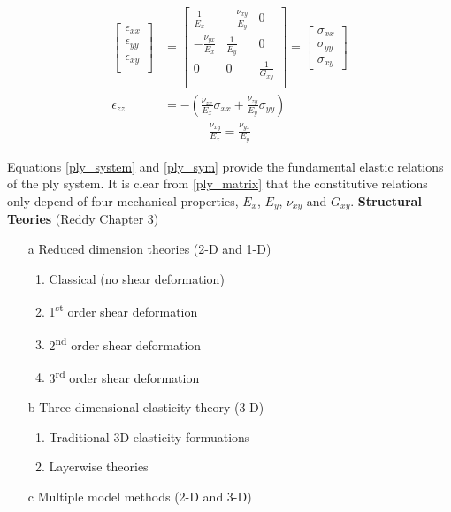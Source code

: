 \begin{subequations}
\label{ply_system}
\begin{align}
\begin{bmatrix}
\epsilon_{xx}\\
\epsilon_{yy}\\
\epsilon_{xy}\\
\end{bmatrix}&=
\begin{bmatrix}
\frac{1}{E_x} & -\frac{\nu_{xy}}{E_y} &  0\\[1mm]
-\frac{\nu_{yx}}{E_x} & \frac{1}{E_y} &  0\\[1mm]
0 & 0 &\frac{1}{G_{xy}}\\[1mm]
\end{bmatrix}=
\begin{bmatrix}
\sigma_{xx}\\
\sigma_{yy}\\
\sigma_{xy} 
\end{bmatrix} \label{ply_matrix} \\[2mm] 
\epsilon_{zz}&=- \left(\frac{\nu_{zx}}{E_x}\sigma_{xx} +\frac{\nu_{zy}}{E_y}\sigma_{yy}\right)
\end{align}
\end{subequations}
\vspace{-6mm}
\begin{align}
\frac{\nu_{xy}}{E_{x}}=\frac{\nu_{yx}}{E_{y}} \label{ply_sym}
\end{align}

Equations \eqref{ply_system} and \eqref{ply_sym} provide the fundamental elastic relations of the ply system. It is clear from \ref{ply_matrix} that the constitutive relations only depend of four mechanical properties, $E_x$, $E_y$, $\nu_{xy}$ and $G_{xy}$.
\newpage
\textbf{Structural Teories} (Reddy Chapter 3)

\begin{enumerate}
\item[a] Reduced dimension theories (2-D and 1-D)
	\begin{enumerate}
	\item Classical (no shear deformation)
	\item 1\textsuperscript{st} order shear deformation
	\item 2\textsuperscript{nd} order shear deformation
	\item 3\textsuperscript{rd} order shear deformation
	\end{enumerate}
\item[b] Three-dimensional elasticity theory (3-D)
	\begin{enumerate}
	\item Traditional 3D elasticity formuations
	\item Layerwise theories
	\end{enumerate}
\item[c] Multiple model methods (2-D and 3-D)
	
\end{enumerate}

 
